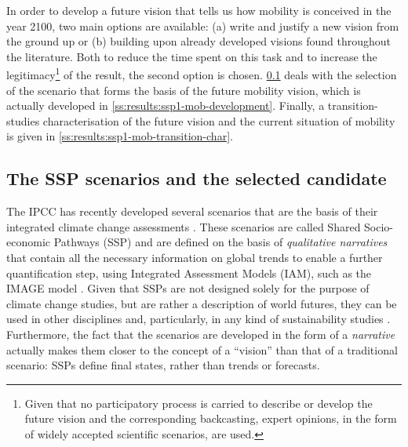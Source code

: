 In order to develop a future vision that tells us how mobility is conceived in the year 2100, two main options are available: (a) write and justify a new vision from the ground up or (b) building upon already developed visions found throughout the literature. Both to reduce the time spent on this task and to increase the legitimacy\footnote{Given that no participatory process is carried to describe or develop the future vision and the corresponding backcasting, expert opinions, in the form of widely accepted scientific scenarios, are used.} of the result, the second option is chosen. \cref{ss:results:ssp-scenarios-candidate} deals with the selection of the scenario that forms the basis of the future mobility vision, which is actually developed in \cref{ss:results:ssp1-mob-development}. Finally, a transition-studies characterisation of the future vision and the current situation of mobility is given in \cref{ss:results:ssp1-mob-transition-char}.

\subsection{The SSP scenarios and the selected candidate}
\label{ss:results:ssp-scenarios-candidate}
The \gls{IPCC} has recently developed several scenarios that are the basis of their integrated climate change assessments \parencite{oneill2017_roadsaheadNarratives,vuuren2017_Energylanduse,fricko2017_markerquantificationShared,fujimori2017_SSP3AIMimplementation,calvin2017_SSP4worlddeepening,kriegler2017_Fossilfueleddevelopment}. These scenarios are called Shared Socio-economic Pathways (SSP) and are defined on the basis of \textit{qualitative narratives} that contain all the necessary information on global trends to enable a further quantification step, using Integrated Assessment Models (IAM), such as the IMAGE model \parencite{vuuren2017_Energylanduse}. Given that SSPs are not designed solely for the purpose of climate change studies, but are rather a description of world futures, they can be used in other disciplines and, particularly, in any kind of sustainability studies \parencite{oneill2017_roadsaheadNarratives}. Furthermore, the fact that the scenarios are developed in the form of a \textit{narrative} actually makes them closer to the concept of a ``vision'' than that of a traditional scenario: SSPs define final states, rather than trends or forecasts.


